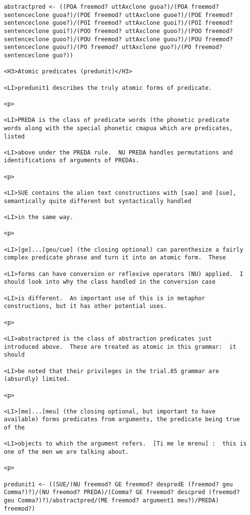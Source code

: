 \documentclass[12pt]{article}
\begin{document}
\begin{lstlisting}
abstractpred <- ((POA freemod? uttAxclone guoa?)/(POA freemod? sentenceclone guoa?)/(POE freemod? uttAxclone guoe?)/(POE freemod? sentenceclone guoe?)/(POI freemod? uttAxclone guoi?)/(POI freemod? sentenceclone guoi?)/(POO freemod? uttAxclone guoo?)/(POO freemod? sentenceclone guoo?)/(POU freemod? uttAxclone guou?)/(POU freemod? sentenceclone guou?)/(PO freemod? uttAxclone guo?)/(PO freemod? sentenceclone guo?))

<H3>Atomic predicates (predunit)</H3>

<LI>predunit1 describes the truly atomic forms of predicate.

<p>

<LI>PREDA is the class of predicate words (the phonetic predicate words along with the special phonetic cmapua which are predicates, listed

<LI>above under the PREDA rule.  NU PREDA handles permutations and identifications of arguments of PREDAs.

<p>

<LI>SUE contains the alien text constructions with [sao] and [sue], semantically quite different but syntactically handled

<LI>in the same way.

<p>

<LI>[ge]...[geu/cue] (the closing optional) can parenthesize a fairly complex predicate phrase and turn it into an atomic form.  These

<LI>forms can have conversion or reflexive operators (NU) applied.  I should look into why the class handled in the conversion case

<LI>is different.  An important use of this is in metaphor constructions, but it has other potential uses.

<p>

<LI>abstractpred is the class of abstraction predicates just introduced above.  These are treated as atomic in this grammar:  it should

<LI>be noted that their privileges in the trial.85 grammar are (absurdly) limited.

<p>

<LI>[me]...[meu] (the closing optional, but important to have available) forms predicates from arguments, the predicate being true of the

<LI>objects to which the argument refers.  [Ti me le mrenu] :  this is one of the men we are talking about.

<p>

predunit1 <- ((SUE/(NU freemod? GE freemod? despredE (freemod? geu Comma?)?)/(NU freemod? PREDA)/(Comma? GE freemod? descpred (freemod? geu Comma?)?)/abstractpred/(ME freemod? argument1 meu?)/PREDA) freemod?)


\end{lstlisting}
\end{document}
